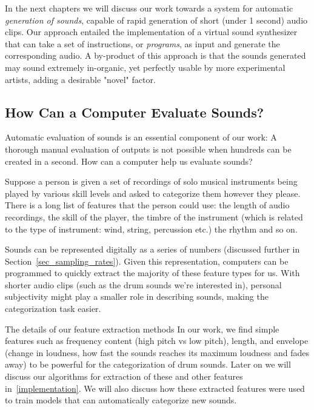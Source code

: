 \documentclass[\main/thesis.tex]{subfiles}
\begin{document}
In the next chapters we will discuss our work towards a system for automatic \textit{generation of sounds}, capable of rapid generation of short (under 1 second) audio clips. Our approach entailed the implementation of a virtual sound synthesizer that can take a set of instructions, or \textit{programs}, as input and generate the corresponding audio. A by-product of this approach is that the sounds generated may sound extremely in-organic, yet perfectly usable by more experimental artists, adding a desirable "novel" factor. 



\subsection{How Can a Computer Evaluate Sounds?}
Automatic evaluation of sounds is an essential component of our work: A thorough manual evaluation of outputs is not possible when hundreds can be created in a second. How can a computer help us evaluate sounds?

Suppose a person is given a set of recordings of solo musical instruments being played by various skill levels and asked to categorize them however they please. There is a long list of features that the person could use: the length of audio recordings, the skill of the player, the timbre of the instrument (which is related to the type of instrument: wind, string, percussion etc.) the rhythm and so on. 

Sounds can be represented digitally as a series of numbers (discussed further in Section~\ref{sec_sampling_rates}). Given this representation, computers can be programmed to quickly extract the majority of these feature types for us. With shorter audio clips (such as the drum sounds we're interested in), personal subjectivity might play a smaller role in describing sounds, making the categorization task easier.

The details of our feature extraction methods In our work, we find simple features such as frequency content (high pitch vs low pitch), length, and envelope (change in loudness, how fast the sounds reaches its maximum loudness and fades away) to be powerful for the categorization of drum sounds. Later on we will discuss our algorithms for extraction of these and other features in~\ref{implementation}. We will also discuss how these extracted features were used to train models that can automatically categorize new sounds.  
\end{document}
